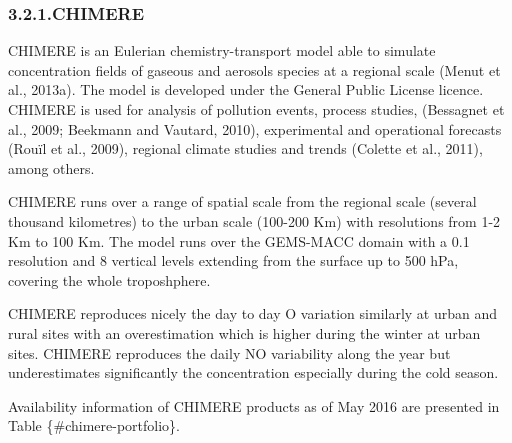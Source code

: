 \documentclass[9pt]{report}
\begin{document}
\subsubsection{3.2.1.\hspace*{0.5em}CHIMERE}\label{sec-chimere}%

\noindent{}CHIMERE is an Eulerian chemistry-transport model able to simulate concentration ﬁelds of gaseous and aerosols species at a regional scale (Menut et al., 2013a). 
The model is developed under the General Public License licence. CHIMERE is used for analysis of pollution events, process studies, (Bessagnet et al., 2009; Beekmann and Vautard, 2010), experimental and operational forecasts (Rouïl et al., 2009), regional climate studies and trends (Colette et al., 2011), among others.%

CHIMERE runs over a range of spatial scale from the regional scale (several thousand kilometres) to the urban scale (100-200 Km) with resolutions from 1-2 Km to 100 Km. 
The model runs over the GEMS-MACC domain with a 0.1\textdegree{} resolution and 8 vertical levels extending from the surface up to 500 hPa, covering the whole troposhphere.%

CHIMERE reproduces nicely the day to day O variation similarly at urban and rural sites with an overestimation which is higher during the winter at urban sites. 
CHIMERE reproduces the daily NO variability along the year but underestimates significantly the concentration especially during the cold season.%

Availability information of CHIMERE products as of May 2016 are presented in Table \{\#chimere-portfolio\}.%
\end{document}
